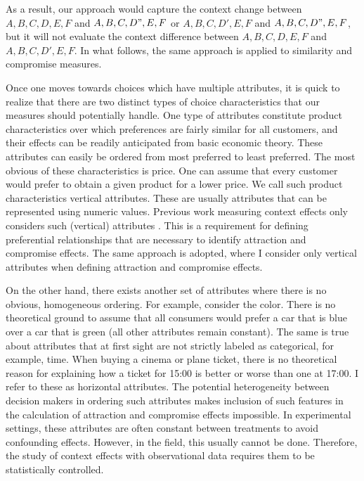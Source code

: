 \documentclass[a4paper,12pt]{article}
\begin{document}
As a result, our approach would capture the context change between ${A, B, C, D, E, F}$ and ${A, B, C, D", E, F}$ or ${A, B, C, D', E, F}$ and ${A, B, C, D", E, F}$, but it will not evaluate the context difference between ${A, B, C, D, E, F}$ and ${A, B, C, D', E, F}$. In what follows, the same approach is applied to similarity and compromise measures.

Once one moves towards choices which have multiple attributes, it is quick to realize that there are two distinct types of choice characteristics that our measures should potentially handle. One type of attributes constitute product characteristics over which preferences are fairly similar for all customers, and their effects can be readily anticipated from basic economic theory. These attributes can easily be ordered from most preferred to least preferred. The most obvious of these characteristics is price. One can assume that every customer would prefer to obtain a given product for a lower price. We call such product characteristics vertical attributes. These are usually attributes that can be represented using numeric values. Previous work measuring context effects only considers such (vertical) attributes \citep{trueblood2014multiattribute, noguchi2018multialternative, noguchi2014attraction}. This is a requirement for defining preferential relationships that are necessary to identify attraction and compromise effects. The same approach is adopted, where I consider only vertical attributes when defining attraction and compromise effects.

On the other hand, there exists another set of attributes where there is no obvious, homogeneous ordering. For example, consider the color. There is no theoretical ground to assume that all consumers would prefer a car that is blue over a car that is green (all other attributes remain constant). The same is true about attributes that at first sight are not strictly labeled as categorical, for example, time. When buying a cinema or plane ticket, there is no theoretical reason for explaining how a ticket for 15:00 is better or worse than one at 17:00.  I refer to these as horizontal attributes. The potential heterogeneity between decision makers in ordering such attributes makes inclusion of such features in the calculation of attraction and compromise effects impossible. In experimental settings, these attributes are often constant between treatments to avoid confounding effects. However, in the field, this usually cannot be done. Therefore, the study of context effects with observational data requires them to be statistically controlled. 
\end{document}
